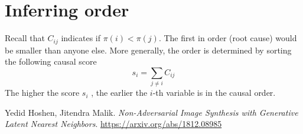 \documentclass{article}
\begin{document}
	\section{Inferring order}
	
	Recall that $C_{ij}$ indicates if $\pi(i)<\pi(j)$. The first in order (root cause) would be smaller than anyone else. More generally, the order is determined by sorting the following causal score
	$$s_i = \sum_{j\neq i} C_{ij}$$
	The higher the score $s_i$ , the earlier the $i$-th variable is in the causal order.
	
	
	
	\newpage
	\begin{thebibliography}{1}
		
		Yedid Hoshen, Jitendra Malik. \textit{Non-Adversarial Image Synthesis with Generative Latent Nearest Neighbors}.  \href{https://arxiv.org/abs/1812.08985}{https://arxiv.org/abs/1812.08985}
		
	\end{thebibliography}
	
	
	
\end{document}

